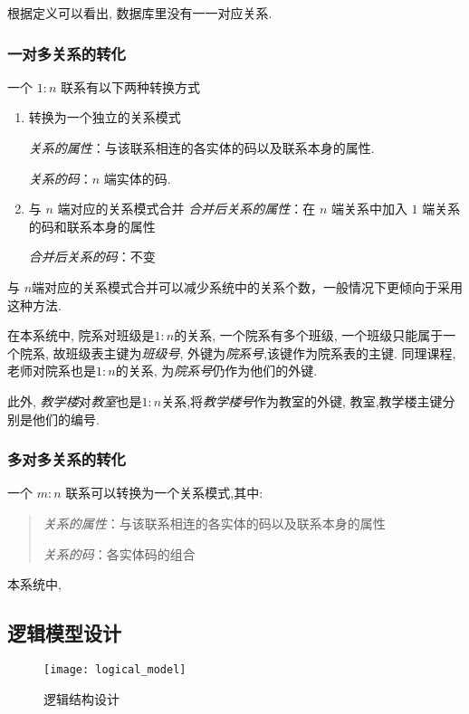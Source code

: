 \documentclass{myreport}
\begin{document}
      根据定义可以看出, 数据库里没有一一对应关系.

    \subsubsection{一对多关系的转化}
      一个 $1:n$ 联系有以下两种转换方式
      \begin{enumerate}
        \item 转换为一个独立的关系模式

          \emph{关系的属性}：与该联系相连的各实体的码以及联系本身的属性.

          \emph{关系的码}：$n$ 端实体的码.
        \item 与 $n$ 端对应的关系模式合并
          \emph{合并后关系的属性}：在 $n$ 端关系中加入 $1$ 端关系的码和联系本身的属性

          \emph{合并后关系的码}：不变
      \end{enumerate}
      与 $n$端对应的关系模式合并可以减少系统中的关系个数，一般情况下更倾向于采用这种方法.

      在本系统中, 院系对班级是$1:n$的关系,
      一个院系有多个班级, 一个班级只能属于一个院系,
      故班级表主键为\emph{班级号}, 外键为\emph{院系号},该键作为院系表的主键.
      同理课程,老师对院系也是$1:n$的关系, 为\emph{院系号}仍作为他们的外键.

      此外, \emph{教学楼}对\emph{教室}也是$1:n$关系,将\emph{教学楼号}作为教室的外键,
      教室,教学楼主键分别是他们的编号.


    \subsubsection{多对多关系的转化}
      一个 $m:n$ 联系可以转换为一个关系模式,其中:
      \begin{quote}
        \emph{关系的属性}：与该联系相连的各实体的码以及联系本身的属性

        \emph{关系的码}：各实体码的组合
      \end{quote}

      本系统中,
  \subsection{逻辑模型设计}
    \begin{figure}[H]
      \centering
      \texttt{[image: logical\_model]}
      \caption{逻辑结构设计}
      \label{fig:logical_model}
    \end{figure}
\end{document}
